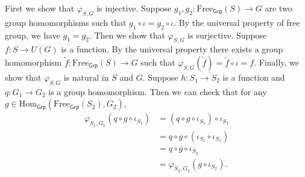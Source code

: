 \begin{prf}
    First we show that $\varphi_{S,G}$ is injective. Suppose $g_1,g_2:\mathrm{Free}_{\mathsf{Grp}}(S)\to G$ are two group homomorphisms such that $g_1\circ \iota=g_2\circ \iota$. By the universal property of free group, we have $g_1=g_2$. Then we show that $\varphi_{S,G}$ is surjective. Suppose $f:S\to U(G)$ is a function. By the universal property there exists a group homomorphism $\widetilde{f}:\mathrm{Free}_{\mathsf{Grp}}(S)\to G$ such that $\varphi_{S,G}(\widetilde{f})=\widetilde{f}\circ \iota=f$. Finally, we show that $\varphi_{S,G}$ is natural in $S$ and $G$. Suppose $h:S_1\to S_2$ is a function and $q:G_1\to G_2$ is a group homomorphism. Then we can check that for any $g\in \mathrm{Hom}_{\mathsf{Grp}}(\mathrm{Free}_{\mathsf{Grp}}(S_2),G_2)$,
    \begin{align*}
        \varphi_{S_1,G_1}(q\circ g\circ \iota_{S_1}) & =(q\circ g\circ \iota_{S_1})\circ \iota_{S_1} \\
                                                     & =q\circ g\circ (\iota_{S_1}\circ \iota_{S_1}) \\
                                                     & =q\circ g\circ \iota_{S_2}                    \\
                                                     & =\varphi_{S_2,G_2}(g\circ \iota_{S_2}).
    \end{align*}
\end{prf}




